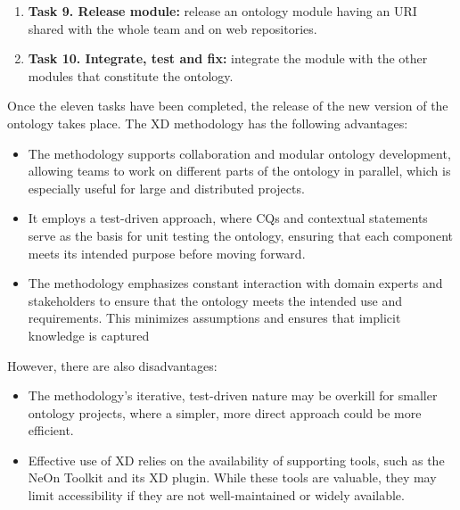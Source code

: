 \begin{enumerate}
    \item \textbf{Task 9. Release module:} release an ontology module having an URI shared with the whole team and on web repositories.

    \item \textbf{Task 10. Integrate, test and fix:} integrate the module with the other modules that constitute the ontology.
\end{enumerate}
Once the eleven tasks have been completed, the release of the new version of the ontology takes place.
The XD methodology has the following advantages:
\begin{itemize}
    \item The methodology supports collaboration and modular ontology development, allowing teams to work on different parts of the ontology in parallel, which is especially useful for large and distributed projects.

    \item It employs a test-driven approach, where CQs and contextual statements serve as the basis for unit testing the ontology, ensuring that each component meets its intended purpose before moving forward.

    \item The methodology emphasizes constant interaction with domain experts and stakeholders to ensure that the ontology meets the intended use and requirements. This minimizes assumptions and ensures that implicit knowledge is captured
\end{itemize}
However, there are also disadvantages:
\begin{itemize}
    \item The methodology's iterative, test-driven nature may be overkill for smaller ontology projects, where a simpler, more direct approach could be more efficient.

    \item Effective use of XD relies on the availability of supporting tools, such as the NeOn Toolkit and its XD plugin. While these tools are valuable, they may limit accessibility if they are not well-maintained or widely available.
\end{itemize}

